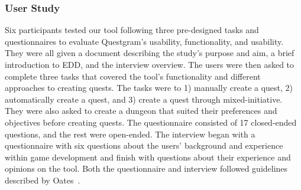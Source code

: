 \subsubsection{User Study}





Six participants tested our tool following three pre-designed tasks and questionnaires to evaluate Questgram's usability, functionality, and usability. They were all given a document describing the study's purpose and aim, a brief introduction to EDD, and the interview overview. The users were then asked to complete three tasks that covered the tool's functionality and different approaches to creating quests. The tasks were to 1) manually create a quest, 2) automatically create a quest, and 3) create a quest through mixed-initiative. They were also asked to create a dungeon that suited their preferences and objectives before creating quests. The questionnaire consisted of 17 closed-ended questions, and the rest were open-ended. The interview began with a questionnaire with six questions about the users' background and experience within game development and finish with questions about their experience and opinions on the tool. Both the questionnaire and interview followed guidelines described by Oates~.  

